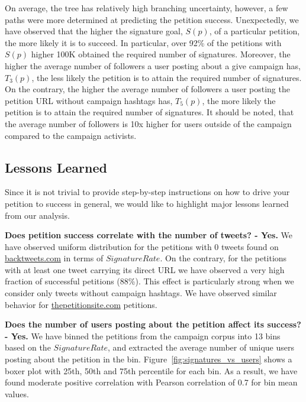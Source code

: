 On average, the tree has relatively high branching uncertainty, however, a few paths were more determined at predicting the petition success.
Unexpectedly, we have observed that the higher the signature goal, $S(p)$, of a particular petition, the more likely it is to succeed. In particular, over 92\% of the petitions with $S(p)$ higher 100K obtained the required number of signatures.
Moreover, the higher the average number of followers a user posting about a give campaign has, $T_3(p)$, the less likely the petition is to attain the required number of signatures.
On the contrary, the higher the average number of followers a user posting the petition URL without campaign hashtags has, $T_5(p)$, the more likely the petition is to attain the required number of signatures.
It should be noted, that the average number of followers is 10x higher for users outside of the campaign compared to the campaign activists.

\subsection{Lessons Learned}
\label{sec:discussion}
Since it is not trivial to provide step-by-step instructions on how to drive your petition to success in general, we would like to highlight major lessons learned from our analysis.

\textbf{Does petition success correlate with the number of tweets? - Yes.} We have observed uniform distribution for the petitions with 0 tweets found on \url{backtweets.com} in terms of $SignatureRate$. On the contrary, for the petitions with at least one tweet carrying its direct URL we have observed a very high fraction of successful petitions (88\%). This effect is particularly strong when we consider only tweets without campaign hashtags. We have observed similar behavior for \url{thepetitionsite.com} petitions.

\textbf{Does the number of users posting about the petition affect its success? - Yes.} We have binned the petitions from the campaign corpus into 13 bins based on the $SignatureRate$, and extracted the average number of unique users posting about the petition in the bin. Figure~\ref{fig:signatures_vs_users} shows a boxer plot with 25th, 50th and 75th percentile for each bin. As a result, we have found moderate positive correlation with Pearson correlation of 0.7 for bin mean values.

